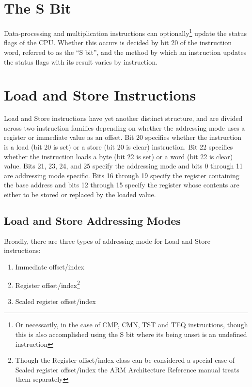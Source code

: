 \section{The S Bit}
\label{sec:appendix:sbit}

Data-processing and multiplication instructions can optionally\footnote{Or necessarily, in the case of CMP, CMN, TST and TEQ instructions, though this is also accomplished using the S bit where its being unset is an undefined instruction\citep[pp. A3-7]{armarm:2005}} update the status flags of the CPU. Whether this occurs is decided by bit 20 of the instruction word, referred to as the ``S bit''\citep[pp. A3-7]{armarm:2005}, and the method by which an instruction updates the status flags with its result varies by instruction.

\section{Load and Store Instructions}
\label{sec:appendix:loadstore}

Load and Store instructions have yet another distinct structure, and are divided across two instruction families depending on whether the addressing mode uses a register or immediate value as an offset. Bit 20 specifies whether the instruction is a load (bit 20 is set) or a store (bit 20 is clear) instruction. Bit 22 specifies whether the instruction loads a byte (bit 22 is set) or a word (bit 22 is clear) value. Bits 21, 23, 24, and 25 specify the addressing mode and bits 0 through 11 are addressing mode specific. Bits 16 through 19 specify the register containing the base address and bits 12 through 15 specify the register whose contents are either to be stored or replaced by the loaded value.

\subsection{Load and Store Addressing Modes}
\label{subsec:appendix:loadstore:addressingmode}

Broadly, there are three\citep[pp. A5-18]{armarm:2005} types of addressing mode for Load and Store instructions:

\begin{enumerate}
    \item Immediate offset/index
    \item Register offset/index\footnote{Though the Register offset/index class can be considered a special case of Scaled register offset/index the ARM Architecture Reference manual treats them separately}
    \item Scaled register offset/index
\end{enumerate}

